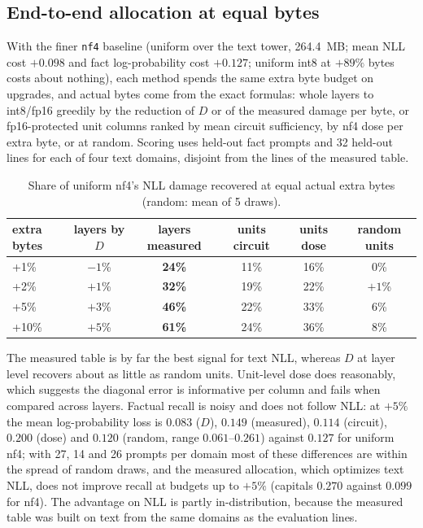 \documentclass[11pt]{article}
\newcommand{\code}[1]{\texttt{#1}}
\begin{document}
\subsection{End-to-end allocation at equal bytes}
With the finer \code{nf4} baseline (uniform over the text tower, 264.4~MB; mean NLL cost $+0.098$ and fact log-probability cost $+0.127$; uniform int8 at $+89\%$ bytes costs about nothing), each method spends the same
extra byte budget on upgrades, and actual bytes come from the exact formulas: whole layers to int8/fp16 greedily by the reduction of $D$ or of the measured damage per byte, or fp16-protected unit columns ranked by mean circuit sufficiency, by nf4 dose per extra byte, or at random.
Scoring uses held-out fact prompts and 32 held-out lines for each of four text domains, disjoint from the lines of the measured table.
\begin{table}[h]
\centering\small
\begin{tabular}{lccccc}
\toprule
extra bytes & layers by $D$ & layers measured & units circuit & units dose & random units\\
\midrule
+1\%  & $-1$\% & \textbf{24\%} & 11\% & 16\% & 0\%\\
+2\%  & $+1$\% & \textbf{32\%} & 19\% & 22\% & $+1$\%\\
+5\%  & $+3$\% & \textbf{46\%} & 22\% & 33\% & 6\%\\
+10\% & $+5$\% & \textbf{61\%} & 24\% & 36\% & 8\%\\
\bottomrule
\end{tabular}
\caption{Share of uniform nf4's NLL damage recovered at equal actual extra bytes (random: mean of 5 draws).}
\label{tab:e2e}
\end{table}
The measured table is by far the best signal for text NLL, whereas $D$ at layer level recovers about as little as random units. Unit-level dose does reasonably, which suggests the
diagonal error is informative per column and fails when compared across layers. Factual recall is noisy and does not follow NLL: at $+5\%$ the mean log-probability loss is $0.083$ ($D$), $0.149$ (measured), $0.114$ (circuit), $0.200$ (dose)
and $0.120$ (random, range $0.061$--$0.261$) against $0.127$ for uniform nf4; with 27, 14 and 26 prompts per domain most of these differences are within the spread of random draws, and the measured allocation, which optimizes text NLL,
does not improve recall at budgets up to $+5\%$ (capitals $0.270$ against $0.099$ for nf4). The advantage on NLL is partly in-distribution, because the measured table was built on text from the same domains as the evaluation lines.
\end{document}
